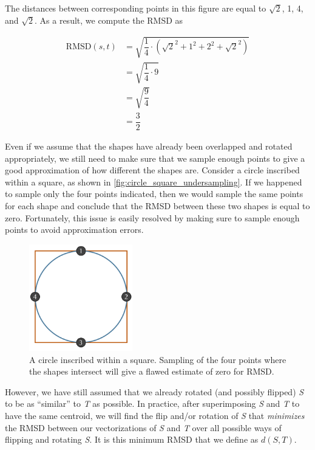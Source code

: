 The distances between corresponding points in this figure are equal to $\sqrt{2}$, 1, 4, and $\sqrt{2}$. As a result, we compute the RMSD as

\begin{align*}
	\text{RMSD}(s, t) &= \sqrt{\dfrac{1}{4} \cdot (\sqrt{2}^2 + 1^2 + 2^2 + \sqrt{2}^2)} \\
	&= \sqrt{\dfrac{1}{4} \cdot 9}\\
	&= \sqrt{\dfrac{9}{4}}\\
	&= \dfrac{3}{2}
\end{align*}


\begin{qbox}\end{qbox}

Even if we assume that the shapes have already been overlapped and rotated appropriately, we still need to make sure that we sample enough points to give a good approximation of how different the shapes are. Consider a circle inscribed within a square, as shown in \autoref{fig:circle_square_undersampling}. If we happened to sample only the four points indicated, then we would sample the same points for each shape and conclude that the RMSD between these two shapes is equal to zero. Fortunately, this issue is easily resolved by making sure to sample enough points to avoid approximation errors.\\

\begin{figure}[h]
	\centering
	\mySfFamily
	\includegraphics[width = 0.4\textwidth]{../images/circle_square_undersampling.png}
	\caption{A circle inscribed within a square. Sampling of the four points where the shapes intersect will give a flawed estimate of zero for RMSD.}
	\label{fig:circle_square_undersampling}
\end{figure}

However, we have still assumed that we already rotated (and possibly flipped) \textit{S} to be as ``similar'' to \textit{T} as possible. In practice, after superimposing \textit{S} and \textit{T} to have the same centroid, we will find the flip and/or rotation of \textit{S} that \textit{minimizes} the RMSD between our vectorizations of \textit{S} and \textit{T} over all possible ways of flipping and rotating \textit{S}. It is this minimum RMSD that we define as $d(S, T)$.

